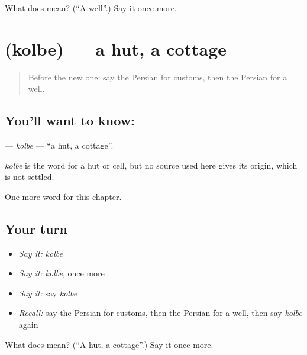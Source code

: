 \begin{tcolorbox}[breakable,colback=teal!4,colframe=teal!35!black,title={Before you move on}]
What does  mean? (\textquotedblleft{}A well\textquotedblright{}.) Say it once more.
\end{tcolorbox}
\section[\texorpdfstring{\fa{کلبه} (kolbe)}{کلبه (kolbe)}]{ (kolbe) — a hut, a cottage}

\label{lesson:FA-C156-kolbe}



\begin{quote}
Before the new one: say the Persian for customs, then the Persian for a well.
\end{quote}

\subsection*{You'll want to know: }
\textbf{} — \emph{kolbe} — \textquotedblleft{}a hut, a cottage\textquotedblright{}.

\begin{cousinweb}
\emph{kolbe} is the word for a hut or cell, but no source used here gives its origin, which is not settled.
\end{cousinweb}

\begin{grammarlens}[title={What you've built}]
One more word for this chapter.
\end{grammarlens}

\subsection*{Your turn}
\begin{itemize}
\raggedright
  \item \emph{Say it:} \emph{kolbe}
  \item \emph{Say it:} \emph{kolbe}, once more
  \item \emph{Say it:} say \emph{kolbe}
  \item \emph{Recall:} say the Persian for customs, then the Persian for a well, then say \emph{kolbe} again
\end{itemize}

\begin{tcolorbox}[breakable,colback=teal!4,colframe=teal!35!black,title={Before you move on}]
What does  mean? (\textquotedblleft{}A hut, a cottage\textquotedblright{}.) Say it once more.
\end{tcolorbox}

